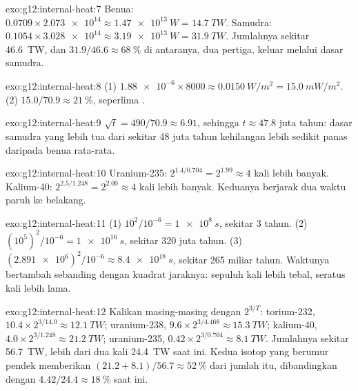 \begin{solution}{exo:g12:internal-heat:7}
Benua: $0.0709 \times \num{2.073e14} \approx \qty{1.47e13}{W} =
\qty{14.7}{TW}$. Samudra: $0.1054 \times \num{3.028e14} \approx
\qty{3.19e13}{W} = \qty{31.9}{TW}$. Jumlahnya sekitar \qty{46.6}{TW}, dan
$31.9/46.6 \approx \qty{68}{\percent}$ di antaranya, dua pertiga, keluar melalui
dasar samudra.
\end{solution}

\begin{solution}{exo:g12:internal-heat:8}
(1) $\num{1.88e-6} \times 8000 \approx \qty{0.0150}{W/m^2} = \qty{15.0}{mW/m^2}$.
(2) $15.0/70.9 \approx \qty{21}{\percent}$, seperlima .
\end{solution}

\begin{solution}{exo:g12:internal-heat:9}
$\sqrt{t} = 490/70.9 \approx 6.91$, sehingga $t \approx 47.8$ juta tahun: dasar
samudra yang lebih tua dari sekitar 48 juta tahun kehilangan lebih sedikit panas
daripada benua rata-rata.
\end{solution}

\begin{solution}{exo:g12:internal-heat:10}
Uranium-235: $2^{1.4/0.704} = 2^{1.99} \approx 4$ kali lebih banyak. Kalium-40:
$2^{2.5/1.248} = 2^{2.00} \approx 4$ kali lebih banyak. Keduanya berjarak dua
waktu paruh ke belakang.
\end{solution}

\begin{solution}{exo:g12:internal-heat:11}
(1) $10^2/10^{-6} = \qty{1e8}{s}$, sekitar 3 tahun. (2) $(10^5)^2/10^{-6} =
\qty{1e16}{s}$, sekitar 320 juta tahun. (3) $(\num{2.891e6})^2/10^{-6}
\approx \qty{8.4e18}{s}$, sekitar 265 miliar tahun. Waktunya bertambah sebanding
dengan kuadrat jaraknya: sepuluh kali lebih tebal, seratus kali lebih lama.
\end{solution}

\begin{solution}{exo:g12:internal-heat:12}
Kalikan masing-masing dengan $2^{3/T}$: torium-232, $10.4 \times 2^{3/14.0} \approx
\qty{12.1}{TW}$; uranium-238, $9.6 \times 2^{3/4.468} \approx \qty{15.3}{TW}$;
kalium-40, $4.0 \times 2^{3/1.248} \approx \qty{21.2}{TW}$; uranium-235,
$0.42 \times 2^{3/0.704} \approx \qty{8.1}{TW}$. Jumlahnya sekitar
\qty{56.7}{TW}, lebih dari dua kali \qty{24.4}{TW} saat ini. Kedua isotop yang
berumur pendek memberikan $(21.2 + 8.1)/56.7 \approx \qty{52}{\percent}$ dari
jumlah itu, dibandingkan dengan $4.42/24.4 \approx \qty{18}{\percent}$ saat ini.
\end{solution}


